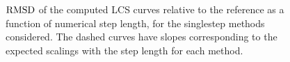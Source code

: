 \begin{figure}[htpb]
    \centering
        
    \caption[$\rmsd$ of the computed LCS curves relative to the reference as a
    function of numerical step length, for the singlestep methods considered]
        {$\rmsd$ of the computed LCS curves relative to the reference as a
        function of numerical step length, for the singlestep methods
        considered. The dashed curves have slopes corresponding to the expected scalings
        with the step length for each method.}
    \label{fig:lcs_rmsd_fp_nn_fixed}
\end{figure}

